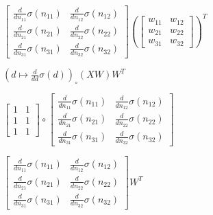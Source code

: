 \documentclass[11pt]{article}
\begin{document}
    
    $\displaystyle \left[\begin{matrix}\frac{d}{d n_{11}} \sigma{\left(n_{11} \right)} & \frac{d}{d n_{12}} \sigma{\left(n_{12} \right)}\\\frac{d}{d n_{21}} \sigma{\left(n_{21} \right)} & \frac{d}{d n_{22}} \sigma{\left(n_{22} \right)}\\\frac{d}{d n_{31}} \sigma{\left(n_{31} \right)} & \frac{d}{d n_{32}} \sigma{\left(n_{32} \right)}\end{matrix}\right] \left(\left[\begin{matrix}w_{11} & w_{12}\\w_{21} & w_{22}\\w_{31} & w_{32}\end{matrix}\right]\right)^{T}$

    
    $\displaystyle {\left( d \mapsto \frac{d}{d d} \sigma{\left(d \right)} \right)}_{\circ}\left({X W}\right) W^{T}$

    
    $\displaystyle \left[\begin{matrix}1 & 1\\1 & 1\\1 & 1\end{matrix}\right] \circ \left[\begin{matrix}\frac{d}{d n_{11}} \sigma{\left(n_{11} \right)} & \frac{d}{d n_{12}} \sigma{\left(n_{12} \right)}\\\frac{d}{d n_{21}} \sigma{\left(n_{21} \right)} & \frac{d}{d n_{22}} \sigma{\left(n_{22} \right)}\\\frac{d}{d n_{31}} \sigma{\left(n_{31} \right)} & \frac{d}{d n_{32}} \sigma{\left(n_{32} \right)}\end{matrix}\right]$

    
    $\displaystyle \left[\begin{matrix}\frac{d}{d n_{11}} \sigma{\left(n_{11} \right)} & \frac{d}{d n_{12}} \sigma{\left(n_{12} \right)}\\\frac{d}{d n_{21}} \sigma{\left(n_{21} \right)} & \frac{d}{d n_{22}} \sigma{\left(n_{22} \right)}\\\frac{d}{d n_{31}} \sigma{\left(n_{31} \right)} & \frac{d}{d n_{32}} \sigma{\left(n_{32} \right)}\end{matrix}\right] W^{T}$
\end{document}
